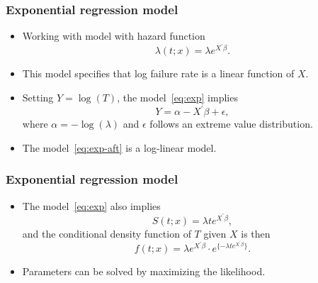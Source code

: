 \documentclass[10pt]{beamer}\usepackage[]{graphicx}\usepackage[]{color}
\begin{document}
\begin{frame}
  \frametitle{Exponential regression model}
  \begin{itemize}
  \item Working with model with hazard function
    \begin{equation}
      \lambda(t; x) = \lambda e^{X^\prime\beta}.
      \label{eq:exp}
    \end{equation}
  \item This model specifies that log failure rate is a linear function of $X$.
  \item Setting $Y = \log(T)$, the model~\eqref{eq:exp} implies
    \begin{equation}
      \label{eq:exp-aft}
      Y = \alpha - X^\prime\beta + \epsilon,
    \end{equation}
    where $\alpha = -\log(\lambda)$ and $\epsilon$ follows an extreme value distribution.
  \item The model~\eqref{eq:exp-aft} is a log-linear model.
  \end{itemize}
\end{frame}

\begin{frame}
  \frametitle{Exponential regression model}
  \begin{itemize}
  \item The model~\eqref{eq:exp} also implies
    $$S(t;x) = \lambda t e^{X^\prime\beta},$$
    and the conditional density function of $T$ given $X$ is then
    $$f(t;x) = \lambda e^{X^\prime\beta}\cdot e^{\{- \lambda t e^{X^\prime\beta}\}}.$$
  \item Parameters can be solved by maximizing the likelihood.
  \end{itemize}
\end{frame}
\end{document}
